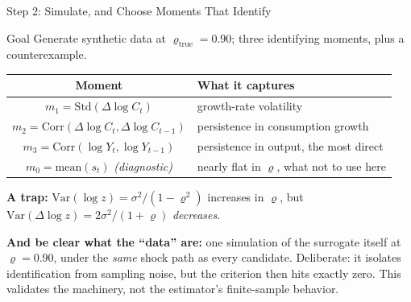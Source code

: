 \documentclass[aspectratio=169,11pt]{beamer}
\newcommand{\emphc}[1]{\textcolor{harvardcrimson}{#1}}
\begin{document}
\begin{frame}{Step 2: Simulate, and Choose Moments That Identify}
\begin{block}{Goal}
Generate synthetic data at $\varrho_{\mathrm{true}} = 0.90$; three identifying moments, plus a counterexample.
\end{block}

\begin{center}\footnotesize
\begin{tabular}{cl}
\toprule
\textbf{Moment} & \textbf{What it captures} \\
\midrule
$m_1 = \mathrm{Std}(\Delta \log C_t)$ & growth-rate volatility \\
$m_2 = \mathrm{Corr}(\Delta \log C_t, \Delta \log C_{t-1})$ & persistence in consumption growth \\
$m_3 = \mathrm{Corr}(\log Y_t, \log Y_{t-1})$ & persistence in output, the most direct \\
\midrule
$m_0 = \mathrm{mean}(s_t)$ \emph{(diagnostic)} & \emphc{nearly flat in $\varrho$, what not to use here} \\
\bottomrule
\end{tabular}\end{center}

\vspace{0.1cm}
{\footnotesize \textbf{A trap:} $\mathrm{Var}(\log z) = \sigma^2/(1-\varrho^2)$ increases in $\varrho$, but $\mathrm{Var}(\Delta\log z) = 2\sigma^2/(1+\varrho)$ \emph{decreases}.

\vspace{2pt}
\textbf{And be clear what the ``data'' are:} one simulation of the surrogate itself at $\varrho = 0.90$, under the \emph{same} shock path as every candidate. Deliberate: it isolates identification from sampling noise, but the criterion then hits exactly zero. \emphc{This validates the machinery, not the estimator's finite-sample behavior.}}
\end{frame}
\end{document}
